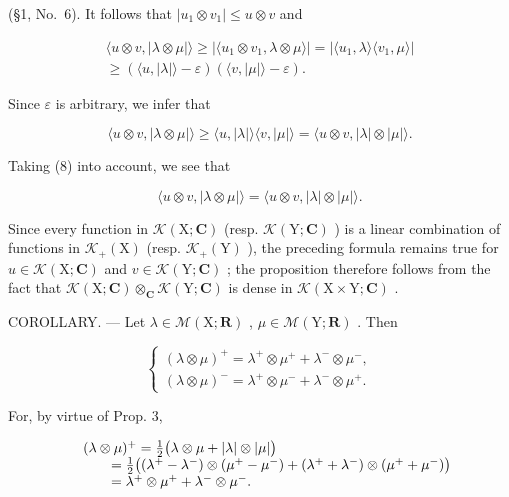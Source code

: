 (§1, No.~6). It follows that \(|u_1 \otimes v_1| \leqslant u \otimes v\) and

\[
\begin{array}{c} \langle u \otimes v, | \lambda \otimes \mu | \rangle \geqslant | \langle u _ {1} \otimes v _ {1}, \lambda \otimes \mu \rangle | = | \langle u _ {1}, \lambda \rangle \langle v _ {1}, \mu \rangle | \\ \geqslant (\langle u, | \lambda | \rangle - \varepsilon) (\langle v, | \mu | \rangle - \varepsilon). \end{array}
\]

Since \(\varepsilon\) is arbitrary, we infer that

\[
\langle u \otimes v, | \lambda \otimes \mu | \rangle \geqslant \langle u, | \lambda | \rangle \langle v, | \mu | \rangle = \langle u \otimes v, | \lambda | \otimes | \mu | \rangle .
\]

Taking (8) into account, we see that

\[
\langle u \otimes v, | \lambda \otimes \mu | \rangle = \langle u \otimes v, | \lambda | \otimes | \mu | \rangle .
\]

Since every function in \(\mathcal{K}(\mathrm{X};\mathbf{C})\) (resp. \(\mathcal{K}(\mathrm{Y};\mathbf{C})\) ) is a linear combination of functions in \(\mathcal{K}_{+}(\mathrm{X})\) (resp. \(\mathcal{K}_{+}(\mathrm{Y})\) ), the preceding formula remains true for \(u\in\mathcal{K}(\mathrm{X};\mathbf{C})\) and \(v\in\mathcal{K}(\mathrm{Y};\mathbf{C})\) ; the proposition therefore follows from the fact that \(\mathcal{K}(\mathrm{X};\mathbf{C})\otimes_{\mathbf{C}}\mathcal{K}(\mathrm{Y};\mathbf{C})\) is dense in \(\mathcal{K}(\mathrm{X}\times\mathrm{Y};\mathbf{C})\) .

COROLLARY. --- Let \(\lambda \in \mathcal{M}(\mathrm{X};\mathbf{R})\) , \(\mu \in \mathcal{M}(\mathrm{Y};\mathbf{R})\) . Then

\[
\left\{ \begin{array}{l} (\lambda \otimes \mu) ^ {+} = \lambda^ {+} \otimes \mu^ {+} + \lambda^ {-} \otimes \mu^ {-}, \\ (\lambda \otimes \mu) ^ {-} = \lambda^ {+} \otimes \mu^ {-} + \lambda^ {-} \otimes \mu^ {+}. \end{array} \right.\tag{9}
\]

For, by virtue of Prop. 3,

\[
\begin{array}{r l} & {(\lambda \otimes \mu) ^ {+} = \frac {1}{2} \big (\lambda \otimes \mu + | \lambda | \otimes | \mu | \big)} \\ & {\qquad = \frac {1}{2} \big ((\lambda^ {+} - \lambda^ {-}) \otimes (\mu^ {+} - \mu^ {-}) + (\lambda^ {+} + \lambda^ {-}) \otimes (\mu^ {+} + \mu^ {-}) \big)} \\ & {\qquad = \lambda^ {+} \otimes \mu^ {+} + \lambda^ {-} \otimes \mu^ {-}.} \end{array}
\]

